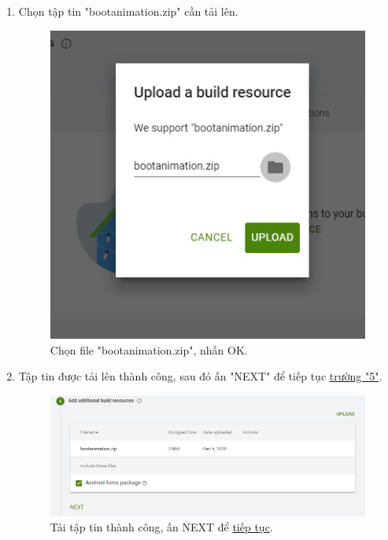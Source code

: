 \begin{enumerate}
\item Chọn tập tin "bootanimation.zip" cần tải lên.
\begin{center}
\begin{figure}[htp]
\begin{center}
\includegraphics[scale=0.5]{image3/sat22.png}
\end{center}
\caption{Chọn file "bootanimation.zip", nhấn OK.}
\end{figure}
\end{center}
\item Tập tin được tải lên thành công, sau đó ấn "NEXT" để tiếp tục \hyperref[truong5]{trường "5"}.
\begin{center}
\begin{figure}[htp]
\begin{center}
\includegraphics[scale=0.5]{image3/sat23.png}
\end{center}
\caption{Tải tập tin thành công, ấn NEXT để \hyperref[truong5]{tiếp tục}.}
\end{figure}
\end{center}
\end{enumerate}
\newpage
